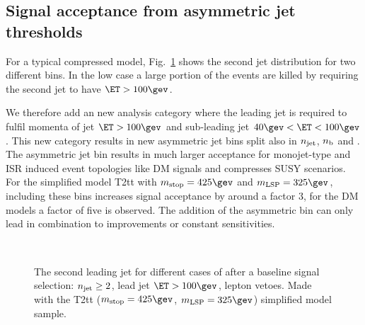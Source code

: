 \subsection{Signal acceptance from asymmetric jet \Pt thresholds}

For a typical compressed model, Fig.~\ref{fig:asymMotivation} shows the second jet \PT
distribution for two different \HT bins. In the low \HT case a large portion of
the events are killed by requiring the second jet to have $\ET>100\gev$. 

We therefore add an new analysis category where the leading jet is required to fulfil 
momenta of jet $\ET>100\gev$ and sub-leading jet $40\gev<\ET<100\gev$. This new category 
results in new asymmetric jet bins split also in $n_{\text{jet}}$, $n_{\text{b}}$ and \HT. The asymmetric jet bin
results in much larger acceptance for monojet-type and ISR induced event topologies like DM signals
and compresses SUSY scenarios. 
For the simplified model T2tt with $m_{\rm stop}=425\gev$ and $m_{\rm LSP}=325\gev$, 
including these bins increases signal acceptance by around a factor 3, for the DM models a factor of five is observed.
The addition of the asymmetric bin can only lead in combination to improvements or constant sensitivities.
\begin{figure}[h!]
  \centering
  ~~
  \\
  \caption{\label{fig:asymMotivation} The second leading jet \PT for different
  cases of \HT after a baseline signal selection: $n_{\text{jet}}\geq2$, lead jet
  $\ET>100\gev$, lepton vetoes. Made with the T2tt ($m_{\rm
    stop}=425\gev$, $m_{\rm LSP}=325\gev$) simplified model sample.}
\end{figure}

